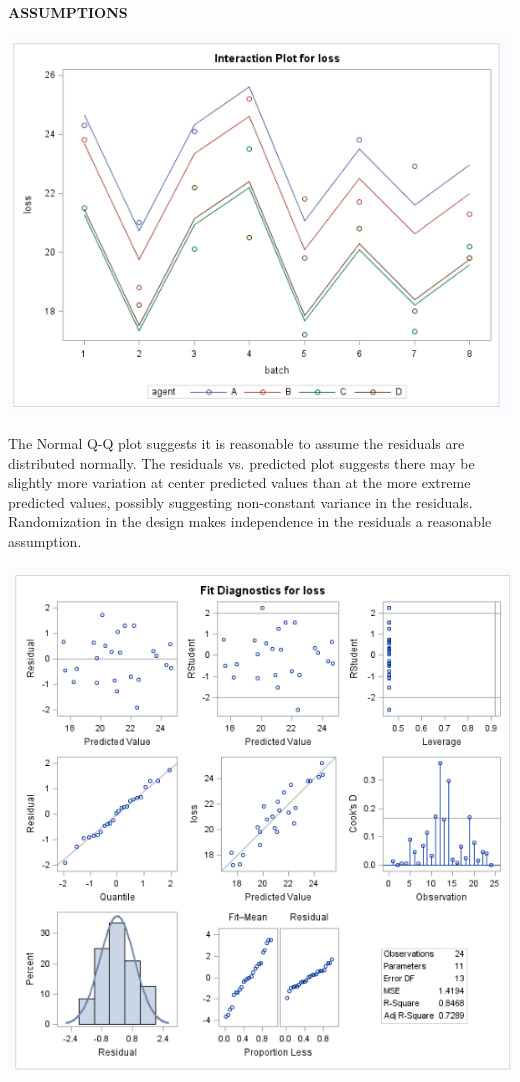 \documentclass{article}\usepackage[]{graphicx}\usepackage[]{color}
\begin{document}
\begin{enumerate}
\begin{enumerate}
{\bf ASSUMPTIONS}

\includegraphics[scale=0.5]{prob3interaction}

The Normal Q-Q plot suggests it is reasonable to assume the residuals are distributed normally. The residuals vs. predicted plot suggests there may be slightly more variation at center predicted values than at the more extreme predicted values, possibly suggesting non-constant variance in the residuals. Randomization in the design makes independence in the residuals a reasonable assumption.

\includegraphics[scale=0.75]{prob3plots}


\end{enumerate}
\end{enumerate}
\end{document}
